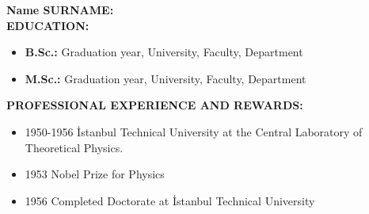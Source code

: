\vspace{10mm}



\textbf{Name SURNAME:} \\




\textbf{EDUCATION:} 
\vspace{-3mm}
\begin{itemize}
  \item \textbf{B.Sc.:} Graduation year, University, Faculty, Department
  \item \textbf{M.Sc.:} Graduation year, University, Faculty, Department
\end{itemize}

\textbf{PROFESSIONAL EXPERIENCE AND REWARDS:}   
\vspace{-3mm}
\begin{itemize}
  \item 1950-1956 İstanbul Technical University at the Central Laboratory of Theoretical Physics.
  \item 1953 Nobel Prize for Physics
  \item 1956 Completed Doctorate at İstanbul Technical University
\end{itemize}

